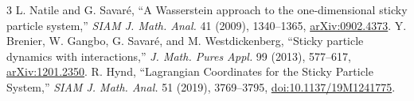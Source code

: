 \documentclass[10pt]{article}
\begin{document}
\begin{thebibliography}{3}
L. Natile and G. Savar\'e,
``A Wasserstein approach to the one-dimensional sticky particle system,''
\emph{SIAM J. Math. Anal.} 41 (2009), 1340--1365,
\href{https://arxiv.org/abs/0902.4373}{arXiv:0902.4373}.
Y. Brenier, W. Gangbo, G. Savar\'e, and M. Westdickenberg,
``Sticky particle dynamics with interactions,''
\emph{J. Math. Pures Appl.} 99 (2013), 577--617,
\href{https://arxiv.org/abs/1201.2350}{arXiv:1201.2350}.
R. Hynd, ``Lagrangian Coordinates for the Sticky Particle System,''
\emph{SIAM J. Math. Anal.} 51 (2019), 3769--3795,
\href{https://doi.org/10.1137/19M1241775}{doi:10.1137/19M1241775}.
\end{thebibliography}
\end{document}
